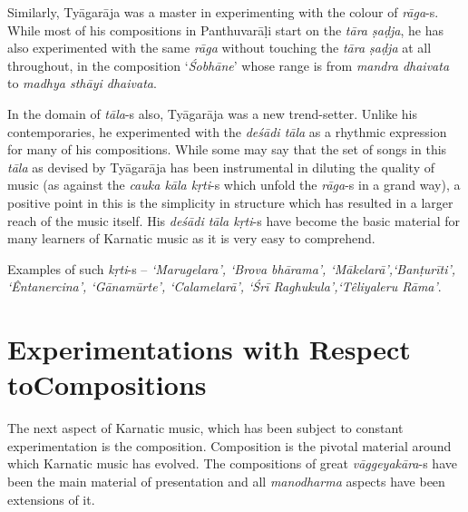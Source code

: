 Similarly, Tyāgarāja was a master in experimenting with the colour of \textit{rāga}-s. While most of his compositions in Panthuvarāḷi start on the \textit{tāra ṣaḍja}, he has also experimented with the same \textit{rāga} without touching the \textit{tāra ṣaḍja} at all throughout, in the composition ‘\textit{Śobhāne}’ whose range is from \textit{mandra dhaivata} to \textit{madhya sthāyi dhaivata}.

In the domain of \textit{tāla}-s also, Tyāgarāja was a new trend-setter. Unlike his contemporaries, he experimented with the \textit{deśādi tāla} as a rhythmic expression for many of his compositions. While some may say that the set of songs in this \textit{tāla} as devised by Tyāgarāja has been instrumental in diluting the quality of music (as against the \textit{cauka kāla kṛti}-s which unfold the \textit{rāga}-s in a grand way), a positive point in this is the simplicity in structure which has resulted in a larger reach of the music itself. His \textit{deśādi tāla kṛti}-s have become the basic material for many learners of Karnatic music as it is very easy to comprehend.

Examples of such \textit{kṛti}-s – \textit{‘Marugelara’, ‘Brova bhārama’, ‘Mākelarā’,\break ‘Banṭurīti’, ‘Êntanercina’, ‘Gānamūrte’, ‘Calamelarā’, ‘Śrī Raghukula’,\break ‘Têliyaleru Rāma’}.

\newpage

\section*{Experimentations with Respect to\hfill \break Compositions}

\vspace{-.2cm}

The next aspect of Karnatic music, which has been subject to constant experimentation is the composition. Composition is the pivotal material around which Karnatic music has evolved. The compositions of great \textit{vāggeyakāra}-s have been the main material of presentation and all \textit{manodharma} aspects have been extensions of it.

\vspace{-.1cm}

